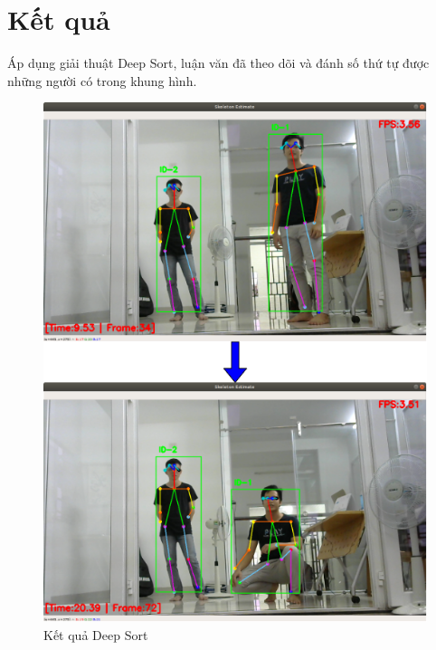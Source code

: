 \section{Kết quả}
Áp dụng giải thuật Deep Sort, luận văn đã theo dõi và đánh số thứ tự được những người có trong khung hình.
\FloatBarrier
\begin{figure}[htp]
\begin{center}
\includegraphics[scale=0.8]{chap5/c5_figs/deep_sort.png}
\end{center}
\caption{Kết quả Deep Sort}
\label{fig:deep_sort}
\end{figure}
\FloatBarrier